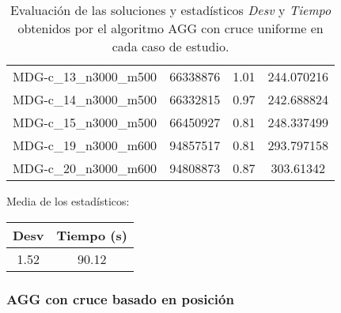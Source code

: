 \documentclass{article}
\begin{document}
\begin{table}[H]
\begin{tabular}{|cccc|}
		MDG-c\_13\_n3000\_m500 & 66338876 & 1.01 & 244.070216\\
		MDG-c\_14\_n3000\_m500 & 66332815 & 0.97 & 242.688824\\
		MDG-c\_15\_n3000\_m500 & 66450927 & 0.81 & 248.337499\\
		MDG-c\_19\_n3000\_m600 & 94857517 & 0.81 & 293.797158\\
		MDG-c\_20\_n3000\_m600 & 94808873 & 0.87 & 303.61342\\
		\hline
	\end{tabular}
	\caption{Evaluación de las soluciones y estadísticos \emph{Desv} y \emph{Tiempo} obtenidos por el algoritmo AGG con cruce uniforme
		en cada caso de estudio.}
	\label{tab:agg-uniforme}
\end{table}

Media de los estadísticos:
\begin{table}[H]
	\centering
	\begin{tabular}{|cc|}
		\hline
		Desv & Tiempo (s)\\ \hline
		 1.52 & 90.12 \\
		\hline
	\end{tabular}
\end{table}

\pagebreak

\subsubsection*{AGG con cruce basado en posición}
\end{document}
